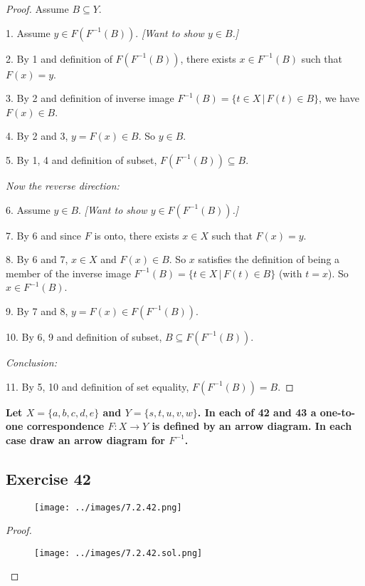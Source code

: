 \documentclass[14pt]{extarticle}
\newcommand{\cy}{\color{cyan}}
\begin{document}
\begin{proof}
    Assume \(B \subseteq Y\).

    1. Assume \(y \in F(F^{-1}(B))\). {\it [Want to show \(y \in B\).]}

    2. By 1 and definition of \(F(F^{-1}(B))\), there exists \(x \in F^{-1}(B)\) such that \(F(x) = y\).

    3. By 2 and definition of inverse image \(F^{-1}(B) = \{t \in X \, | \, F(t) \in B\}\), we have \(F(x) \in B\).

    4. By 2 and 3, \(y = F(x) \in B\). So \(y \in B\).

    5. By 1, 4 and definition of subset, \(F(F^{-1}(B)) \subseteq B\).

        {\it Now the reverse direction:}

    6. Assume \(y \in B\). {\it [Want to show \(y \in F(F^{-1}(B))\).]}

    7. By 6 and since $F$ is onto, there exists \(x \in X\) such that \(F(x) = y\).

    8. By 6 and 7, \(x \in X\) and \(F(x) \in B\). So $x$ satisfies the definition of being a member of the inverse
    image \(F^{-1}(B) = \{t \in X \, | \, F(t) \in B\}\) (with $t = x$). So \(x \in F^{-1}(B)\).

    9. By 7 and 8, \(y = F(x) \in F(F^{-1}(B))\).

    10. By 6, 9 and definition of subset, \(B \subseteq F(F^{-1}(B))\).

        {\it Conclusion:}

    11. By 5, 10 and definition of set equality, \(F(F^{-1}(B)) = B\).
\end{proof}

{\bf \cy Let \(X = \{a, b, c, d, e\}\) and \(Y = \{s, t, u, v, w\}\). In each of 42 and 43 a one-to-one correspondence
\(F: X \to Y\) is defined by an arrow diagram. In each case draw an arrow diagram for \(F^{-1}\).}

\subsection{Exercise 42}
\begin{figure}[ht!]
    \centering
    \texttt{[image: ../images/7.2.42.png]}
\end{figure}

\begin{proof}
    \begin{figure}[ht!]
        \centering
        \texttt{[image: ../images/7.2.42.sol.png]}
    \end{figure}
\end{proof}
\end{document}
